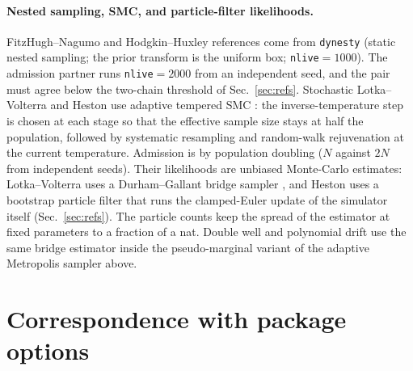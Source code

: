 \documentclass[10pt]{article}
\begin{document}
\paragraph{Nested sampling, SMC, and particle-filter likelihoods.} FitzHugh--Nagumo and
Hodgkin--Huxley references come from \texttt{dynesty} (static nested sampling; the prior transform is
the uniform box; \texttt{nlive}${=}1000$). The admission partner runs \texttt{nlive}${=}2000$ from an
independent seed, and the pair must agree below the two-chain threshold of Sec.~\ref{sec:refs}.
Stochastic Lotka--Volterra and Heston use adaptive tempered SMC \citep{delmoral2006}: the
inverse-temperature step is chosen at each stage so that the effective sample size stays at half the
population, followed by systematic resampling and random-walk rejuvenation at the current temperature.
Admission is by population doubling ($N$ against $2N$ from independent seeds). Their likelihoods are
unbiased Monte-Carlo estimates: Lotka--Volterra uses a Durham--Gallant bridge sampler
\citep{durham2002}, and Heston uses a bootstrap particle filter that runs the clamped-Euler update of
the simulator itself (Sec.~\ref{sec:refs}). The particle counts keep the spread of the estimator at
fixed parameters to a fraction of a nat. Double well and polynomial drift use the same bridge
estimator inside the pseudo-marginal variant \citep{andrieu2010} of the adaptive Metropolis sampler
above.

\section{Correspondence with package options}
\label{app:package}
\end{document}
